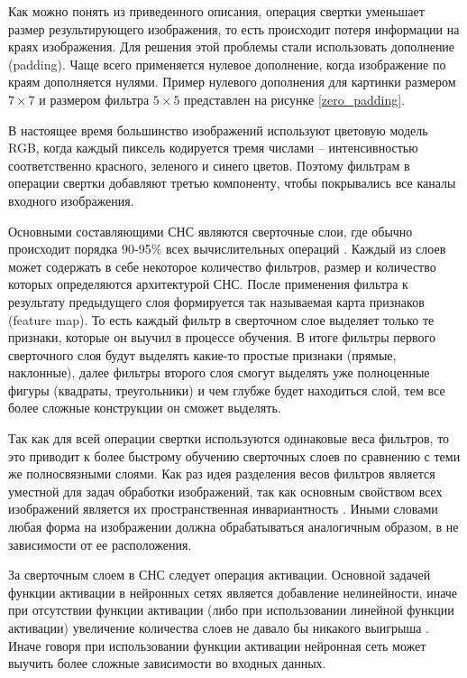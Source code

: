 Как можно понять из приведенного описания, операция свертки уменьшает размер результирующего изображения, то есть происходит
потеря информации на краях изображения. Для решения этой проблемы стали использовать дополнение (padding). Чаще всего применяется
нулевое дополнение, когда изображение по краям дополняется нулями. Пример нулевого дополнения для картинки размером 
$7 \times 7$ и размером фильтра $5 \times 5$ представлен на рисунке \ref{zero_padding}.

В настоящее время большинство изображений используют цветовую модель RGB, когда каждый пиксель кодируется тремя числами 
-- интенсивностью соответственно красного, зеленого и синего цветов. Поэтому фильтрам в операции свертки добавляют
третью компоненту, чтобы покрывались все каналы входного изображения.


Основными составляющими СНС являются сверточные слои, где обычно происходит порядка 90-95\% всех вычислительных операций \cite{PARALLEL_CNN}.
Каждый из слоев может содержать в себе некоторое количество фильтров, размер и количество которых определяются архитектурой СНС.
После применения фильтра к результату предыдущего слоя формируется так называемая карта признаков (feature map). То есть
каждый фильтр в сверточном слое выделяет только те признаки, которые он выучил в процессе обучения. В итоге фильтры первого 
сверточного слоя будут выделять какие-то простые признаки (прямые, наклонные), далее фильтры второго слоя смогут выделять 
уже полноценные фигуры (квадраты, треугольники) и чем глубже будет находиться слой, тем все более сложные конструкции он 
сможет выделять.

Так как для всей операции свертки используются одинаковые веса фильтров, то это приводит к более быстрому обучению 
сверточных слоев по сравнению с теми же полносвязными слоями. Как раз идея разделения весов фильтров является уместной
для задач обработки изображений, так как основным свойством всех изображений является их пространственная инвариантность 
\cite{NN_AND_DL}. Иными словами любая форма на изображении должна обрабатываться аналогичным образом, в не зависимости 
от ее расположения.

За сверточным слоем в СНС следует операция активации. Основной задачей функции активации в нейронных сетях является 
добавление нелинейности, иначе при отсутствии функции активации (либо при использовании линейной функции активации) 
увеличение количества слоев не давало бы никакого выигрыша \cite{NN_AND_DL}. Иначе говоря при использовании функции 
активации нейронная сеть может выучить более сложные зависимости во входных данных. 


